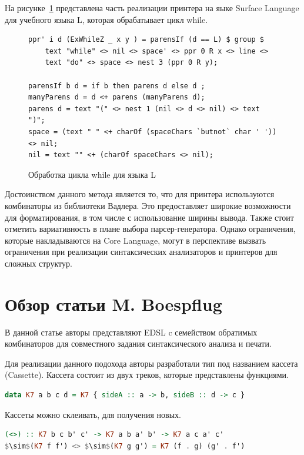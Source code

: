 \documentclass{matmex-diploma-custom}
\begin{document}
На рисунке~\ref{ЯзыкLFliPpr} представлена часть реализации принтера на яыке Surface Language для учебного языка L, которая обрабатывает цикл while.
\begin{figure}[ht]
\centering
\begin{lstlisting}
ppr' i d (ExWhileZ _ x y ) = parensIf (d == L) $ group $ 
    text "while" <> nil <> space' <> ppr 0 R x <> line <> 
    text "do" <> space <> nest 3 (ppr 0 R y);
                                                
parensIf b d = if b then parens d else d ;
manyParens d = d <+ parens (manyParens d);
parens d = text "(" <> nest 1 (nil <> d <> nil) <> text ")";
space = (text " " <+ charOf (spaceChars `butnot` char ' ')) <> nil;
nil = text "" <+ (charOf spaceChars <> nil);
\end{lstlisting}
\caption{Обработка цикла while для языка L}
\label{ЯзыкLFliPpr}
\end{figure}

Достоинством данного метода является то, что для принтера используются комбинаторы из библиотеки Вадлера. Это предоставляет широкие возможности для форматирования, в том числе с использование ширины вывода. Также стоит отметить вариативность в плане выбора парсер-генератора. Однако ограничения, которые накладываются на Core Language, могут в перспективе вызвать ограничения при реализации синтаксических анализаторов и принтеров для сложных структур.


\section{Обзор статьи M. Boespflug
}

В данной статье авторы представляют EDSL c семейством обратимых комбинаторов для совместного задания синтаксического анализа и печати. 

Для реализации данного подохода авторы разработали тип под названием кассета (Cassette). Кассета состоит из двух треков, которые представлены функциями.
\begin{lstlisting}[mathescape,language = haskell]
data K7 a b c d = K7 { sideA :: a -> b, sideB :: d -> c }
\end{lstlisting}
Кассеты можно склеивать, для получения новых.
\begin{lstlisting}[mathescape,language = haskell]
(<>) :: K7 b c b' c' -> K7 a b a' b' -> K7 a c a' c'
$\sim$(K7 f f') <> $\sim$(K7 g g') = K7 (f . g) (g' . f')
\end{lstlisting}
\end{document}
